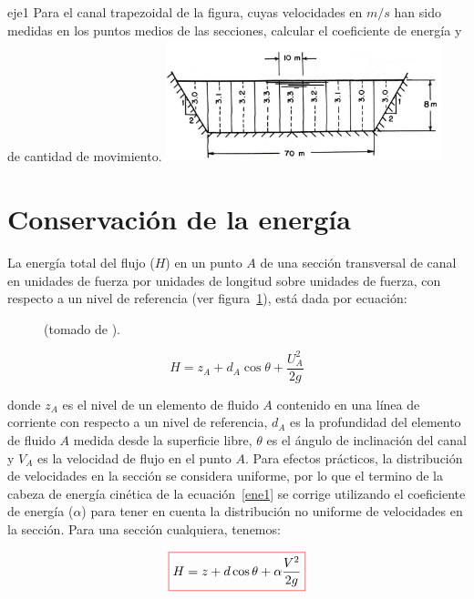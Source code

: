 \documentclass[11pt, oneside]{article}
\begin{document}
\begin{eje}{}{eje1}
    Para el canal trapezoidal de la figura, cuyas velocidades en $m/s$ han sido medidas en los puntos medios de las secciones, calcular el coeficiente de energ\'ia y de cantidad de movimiento.
    \includegraphics[width=8cm]{fig118.jpeg} %
\end{eje}


\section{Conservaci\'on de la energ\'ia}%
La energ\'ia total del flujo ($H$) en un punto $A$ de una secci\'on transversal de canal en unidades de fuerza por unidades de longitud sobre unidades de fuerza, con respecto a un nivel de referencia (ver figura~\ref{fig9}), est\'a dada por ecuaci\'on:

\begin{figure}[h]
\centering
\caption{(tomado de \cite{VChow}).}
\label{fig9}
\end{figure}

\begin{equation}
H = z_{A} + d_{A} \cos \theta + \frac{U_A^2}{2g} 
\label{ene1}
\end{equation}

donde $z_A$ es el nivel de un elemento de fluido $A$ contenido en una l\'inea de corriente con respecto a un nivel de referencia, $d_A$ es la profundidad del elemento de fluido $A$ medida desde la superficie libre, $\theta$ es el \'angulo de inclinaci\'on del canal y $V_A$ es la velocidad de flujo en el punto $A$. Para efectos pr\'acticos, la distribuci\'on de velocidades en la secci\'on se considera uniforme, por lo que el termino de la cabeza de energ\'ia cin\'etica de la ecuaci\'on~\ref{ene1} se corrige utilizando el coeficiente de energ\'ia ($\alpha$) para tener en cuenta la distribuci\'on no uniforme de velocidades en la secci\'on. Para una secci\'on cualquiera, tenemos:

\begin{equation}
\color{red}\boxed{\color{black} H = z + d \cos \theta + \alpha\frac{V^2}{2g} }
\label{ene2}
\end{equation}
\end{document}
